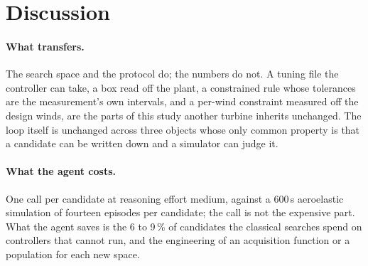 \documentclass{article}
\begin{document}
\section{Discussion}
\label{sec:discussion}

\paragraph{What transfers.} The search space and the protocol do; the numbers do not. A tuning file the controller can take, a box read off the plant, a constrained rule whose tolerances are the measurement's own intervals, and a per-wind constraint measured off the design winds, are the parts of this study another turbine inherits unchanged. The loop itself is unchanged across three objects whose only common property is that a candidate can be written down and a simulator can judge it.

\paragraph{What the agent costs.} One call per candidate at reasoning effort medium, against a 600\,s aeroelastic simulation of fourteen episodes per candidate; the call is not the expensive part. What the agent saves is the 6 to 9\,\% of candidates the classical searches spend on controllers that cannot run, and the engineering of an acquisition function or a population for each new space.
\end{document}
